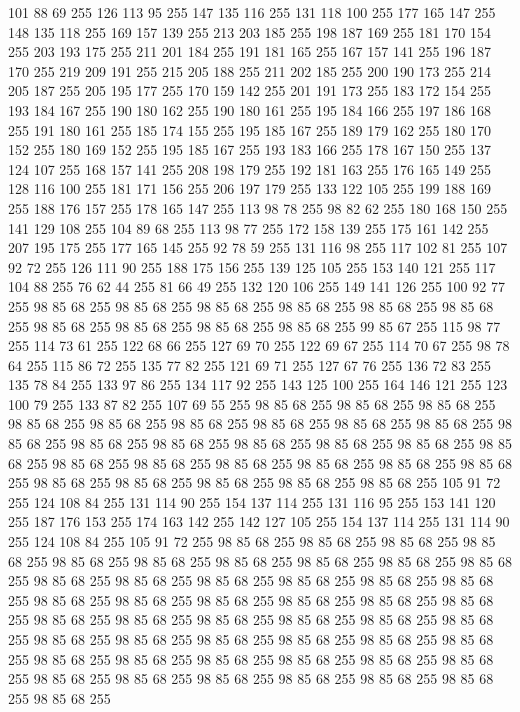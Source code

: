101 88 69 255 126 113 95 255 147 135 116 255 131 118 100 255 177 165 147 255 148 135 118 255 169 157 139 255 213 203 185 255 198 187 169 255 181 170 154 255 203 193 175 255 211 201 184 255 191 181 165 255 167 157 141 255 196 187 170 255 219 209 191 255 215 205 188 255 211 202 185 255 200 190 173 255 214 205 187 255 205 195 177 255 170 159 142 255 201 191 173 255 183 172 154 255 193 184 167 255 190 180 162 255 190 180 161 255 195 184 166 255 197 186 168 255 191 180 161 255 185 174 155 255 195 185 167 255 189 179 162 255 180 170 152 255 180 169 152 255 195 185 167 255 193 183 166 255 178 167 150 255 137 124 107 255 168 157 141 255 208 198 179 255 192 181 163 255 176 165 149 255 128 116 100 255 181 171 156 255 206 197 179 255 133 122 105 255 199 188 169 255 188 176 157 255 178 165 147 255 113 98 78 255 98 82 62 255 180 168 150 255 141 129 108 255 104 89 68 255 113 98 77 255 172 158 139 255 175 161 142 255 207 195 175 255 177 165 145 255 92 78 59 255 131 116 98 255 117 102 81 255 107 92 72 255
126 111 90 255 188 175 156 255 139 125 105 255 153 140 121 255 117 104 88 255 76 62 44 255 81 66 49 255 132 120 106 255 149 141 126 255 100 92 77 255 98 85 68 255 98 85 68 255 98 85 68 255 98 85 68 255 98 85 68 255 98 85 68 255 98 85 68 255 98 85 68 255 98 85 68 255 98 85 68 255 99 85 67 255 115 98 77 255 114 73 61 255 122 68 66 255 127 69 70 255 122 69 67 255 114 70 67 255 98 78 64 255 115 86 72 255 135 77 82 255 121 69 71 255 127 67 76 255 136 72 83 255 135 78 84 255 133 97 86 255 134 117 92 255 143 125 100 255 164 146 121 255 123 100 79 255 133 87 82 255 107 69 55 255 98 85 68 255 98 85 68 255 98 85 68 255 98 85 68 255 98 85 68 255 98 85 68 255 98 85 68 255 98 85 68 255 98 85 68 255 98 85 68 255 98 85 68 255 98 85 68 255 98 85 68 255 98 85 68 255 98 85 68 255 98 85 68 255 98 85 68 255 98 85 68 255 98 85 68 255 98 85 68 255 98 85 68 255 98 85 68 255 98 85 68 255
98 85 68 255 98 85 68 255 98 85 68 255 98 85 68 255 105 91 72 255 124 108 84 255 131 114 90 255 154 137 114 255 131 116 95 255 153 141 120 255 187 176 153 255 174 163 142 255 142 127 105 255 154 137 114 255 131 114 90 255 124 108 84 255 105 91 72 255 98 85 68 255 98 85 68 255 98 85 68 255 98 85 68 255 98 85 68 255 98 85 68 255 98 85 68 255 98 85 68 255 98 85 68 255 98 85 68 255 98 85 68 255 98 85 68 255 98 85 68 255 98 85 68 255 98 85 68 255 98 85 68 255 98 85 68 255 98 85 68 255 98 85 68 255 98 85 68 255 98 85 68 255 98 85 68 255 98 85 68 255 98 85 68 255 98 85 68 255 98 85 68 255 98 85 68 255 98 85 68 255 98 85 68 255 98 85 68 255 98 85 68 255 98 85 68 255 98 85 68 255 98 85 68 255 98 85 68 255 98 85 68 255 98 85 68 255 98 85 68 255 98 85 68 255 98 85 68 255 98 85 68 255 98 85 68 255 98 85 68 255 98 85 68 255 98 85 68 255 98 85 68 255 98 85 68 255

